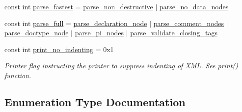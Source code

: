 \begin{DoxyCompactItemize}
\item 
const int \hyperlink{namespacerapidxml_a64da06dfdab7c86ca954bda4fecb978f}{parse\+\_\+fastest} = \hyperlink{namespacerapidxml_a45d4d8fef551beaaba23a83b847fd6a3}{parse\+\_\+non\+\_\+destructive} $\vert$ \hyperlink{namespacerapidxml_ac2d21ef14a4e8936b94aca5d38b1a74d}{parse\+\_\+no\+\_\+data\+\_\+nodes}
\item 
const int \hyperlink{namespacerapidxml_abb48dc65db75d9e49734bc5bd2fabbfc}{parse\+\_\+full} = \hyperlink{namespacerapidxml_a999d782659513f8015ea4236e3204c42}{parse\+\_\+declaration\+\_\+node} $\vert$ \hyperlink{namespacerapidxml_ae093dd49e2f59fa39eee95f1a6568e32}{parse\+\_\+comment\+\_\+nodes} $\vert$ \hyperlink{namespacerapidxml_a41002b49780a90a0bbcc28ce8b895fe4}{parse\+\_\+doctype\+\_\+node} $\vert$ \hyperlink{namespacerapidxml_a03fe68fcf5d28f38476e0fd31adecc4c}{parse\+\_\+pi\+\_\+nodes} $\vert$ \hyperlink{namespacerapidxml_a7ce8f40fda68338e20b56f41e48e49f3}{parse\+\_\+validate\+\_\+closing\+\_\+tags}
\item 
const int \hyperlink{namespacerapidxml_a65477b812a80f5bda693ec57e57de064}{print\+\_\+no\+\_\+indenting} = 0x1
\begin{DoxyCompactList}\small\item\em Printer flag instructing the printer to suppress indenting of X\+ML. See \hyperlink{namespacerapidxml_a0fb0be6eba49fb2e2646d5a72a0dc355}{print()} function. \end{DoxyCompactList}\end{DoxyCompactItemize}


\subsection{Enumeration Type Documentation}
